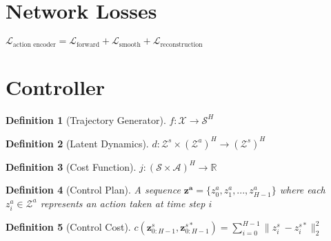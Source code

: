 \documentclass{article}
\newtheorem{definition}{Definition}
\begin{document}

\section{Network Losses}

$\mathcal{L}_\text{action encoder}=\mathcal{L}_\text{forward} + \mathcal{L}_\text{smooth}+\mathcal{L}_\text{reconstruction}$



\section{Controller}

\begin{definition}[Trajectory Generator]
    $f: \mathcal{X} \rightarrow \mathcal{S}^H$
\end{definition}
\begin{definition}[Latent Dynamics]
    $d: \mathcal{Z}^s \times \left(\mathcal{Z}^a\right)^H \rightarrow (\mathcal{Z}^s)^H$
\end{definition}
\begin{definition}[Cost Function]
    $j: (\mathcal{S} \times \mathcal{A})^H \rightarrow \mathbb{R}$
\end{definition}
\begin{definition}[Control Plan]
    A sequence $\mathbf{z^a} = \{z^a_0, z^a_1, ..., z^a_{H-1}\}$ where each $z^a_i \in \mathcal{Z}^a$ represents an action taken at time step $i$
\end{definition}
\begin{definition}[Control Cost]
    $c(\mathbf{z}_{0:H-1}^s, \mathbf{z}_{0:H-1}^{s*}) = \sum\limits_{i=0}^{H-1} \| z^s_i\ - z^{s*}_i \|_2^2$
\end{definition}
\end{document}
